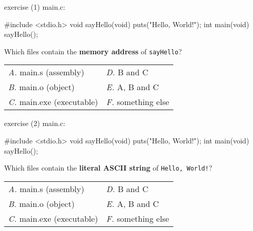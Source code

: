 
\begin{frame}[fragile,label=exCL]{exercise (1)}
main.c: \\
\begin{ccode}
#include <stdio.h>
void sayHello(void) {
    puts("Hello, World!");
}
int main(void) {
    sayHello();
}
\end{ccode}
Which files contain the \textbf{memory address} of \texttt{sayHello}?
\begin{tabular}{ll}
\textit{A.} main.s (assembly) & \textit{D.} B and C \\
\textit{B.} main.o (object) &  \textit{E.} A, B and C \\
\textit{C.} main.exe (executable) & \textit{F.} something else \\
\end{tabular}
\end{frame}

\begin{frame}[fragile,label=exCL2]{exercise (2)}
main.c: \\
\begin{ccode}
#include <stdio.h>
void sayHello(void) {
    puts("Hello, World!");
}
int main(void) {
    sayHello();
}
\end{ccode}
Which files contain the \textbf{literal ASCII string} of \texttt{Hello, World!}?
\begin{tabular}{ll}
\textit{A.} main.s (assembly) & \textit{D.} B and C \\
\textit{B.} main.o (object) &  \textit{E.} A, B and C \\
\textit{C.} main.exe (executable) & \textit{F.} something else \\
\end{tabular}
\end{frame}
